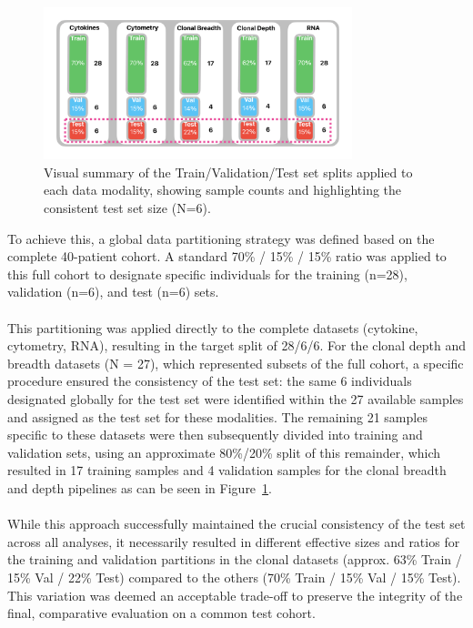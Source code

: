 \documentclass[12pt,a4paper]{report}
\begin{document}
\begin{figure}[H]
  \centering
  \includegraphics[width=0.8\textwidth]{images/split-1.png}
    \caption[Data Splits per Modality]{Visual summary of the Train/Validation/Test set splits applied to each data modality, showing sample counts and highlighting the consistent test set size (N=6).}
  \label{fig:split_data}
\end{figure}
\noindent
To achieve this, a global data partitioning strategy was defined based on the complete 40-patient cohort. A standard 70\% / 15\% / 15\% ratio was applied to this full cohort to designate specific individuals for the training (n=28), validation (n=6), and test (n=6) sets.\\
\\
This partitioning was applied directly to the complete datasets (cytokine, cytometry, RNA), resulting in the target split of 28/6/6. For the clonal depth and breadth datasets (N = 27), which represented subsets of the full cohort, a specific procedure ensured the consistency of the test set: the same 6 individuals designated globally for the test set were identified within the 27 available samples and assigned as the test set for these modalities. The remaining 21 samples specific to these datasets were then subsequently divided into training and validation sets, using an approximate 80\%/20\% split of this remainder, which resulted in 17 training samples and 4 validation samples for the clonal breadth and depth pipelines as can be seen in Figure~\ref{fig:split_data}.\\
\\
While this approach successfully maintained the crucial consistency of the test set across all analyses, it necessarily resulted in different effective sizes and ratios for the training and validation partitions in the clonal datasets (approx. 63\% Train / 15\% Val / 22\% Test) compared to the others (70\% Train / 15\% Val / 15\% Test). This variation was deemed an acceptable trade-off to preserve the integrity of the final, comparative evaluation on a common test cohort.
\end{document}
